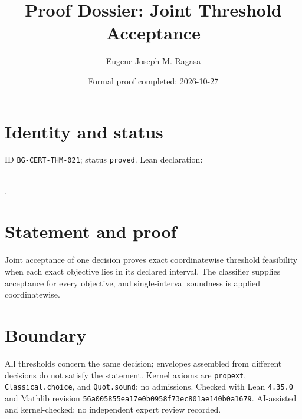 \documentclass[11pt]{article}
\title{Proof Dossier: Joint Threshold Acceptance}\author{Eugene Joseph M. Ragasa}\date{Formal proof completed: 2026-10-27}
\begin{document}
\maketitle
\section{Identity and status}
ID \texttt{BG-CERT-THM-021}; status \texttt{proved}. Lean declaration:
\par{}\\
{\tiny{}}.
\section{Statement and proof}
Joint acceptance of one decision proves exact coordinatewise threshold feasibility when
each exact objective lies in its declared interval. The classifier supplies acceptance
for every objective, and single-interval soundness is applied coordinatewise.
\section{Boundary}
All thresholds concern the same decision; envelopes assembled from different decisions do
not satisfy the statement. Kernel axioms are \texttt{propext}, \texttt{Classical.choice},
and \texttt{Quot.sound}; no admissions. Checked with Lean \texttt{4.35.0} and Mathlib
revision \texttt{56a005855ea17e0b0958f73ec801ae140b0a1679}. AI-assisted and
kernel-checked; no independent expert review recorded.
\end{document}
